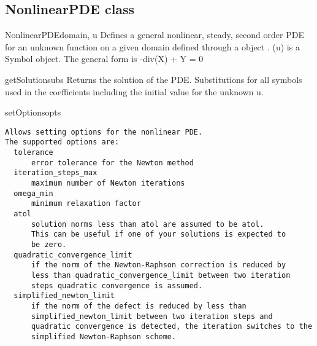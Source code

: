 \subsection{NonlinearPDE class}
\begin{classdesc}{NonlinearPDE}{domain, u}
Defines a general nonlinear, steady, second order PDE for an unknown function  on a given domain defined through a \Domain object . \var(u) is a Symbol object.
The general form is -div(X) + Y = 0 
\end{classdesc}
\iffalse
\begin{methoddesc}[NonlinearPDE]{concatenateRow}{}
test
\end{methoddesc}
\begin{methoddesc}[NonlinearPDE]{createCoefficient}{}
test
\end{methoddesc}
\begin{methoddesc}[NonlinearPDE]{getUnknownSymbol}{}
test
\end{methoddesc}
\begin{methoddesc}[NonlinearPDE]{getLinearSolverOptions}{}
test
\end{methoddesc}
\begin{methoddesc}[NonlinearPDE]{getLinearPDE}{}
test
\end{methoddesc}
\begin{methoddesc}[NonlinearPDE]{getNumSolutions}{}
test
\end{methoddesc}
\begin{methoddesc}[NonlinearPDE]{getShapeOfCoefficient}{}
test
\end{methoddesc}
\begin{methoddesc}[NonlinearPDE]{getCoefficient}{}
test
\end{methoddesc}
\begin{methoddesc}[NonlinearPDE]{getSensitivity}{}
test
\end{methoddesc}
\fi
\begin{methoddesc}[NonlinearPDE]{getSolution}{subs}
Returns the solution of the PDE. Substitutions for all symbols used in the coefficients including the initial value for the unknown u.
\end{methoddesc}
\pagebreak
\begin{methoddesc}[NonlinearPDE]{setOptions}{opts}
\begin{verbatim}
Allows setting options for the nonlinear PDE.
The supported options are:
  tolerance
      error tolerance for the Newton method
  iteration_steps_max
      maximum number of Newton iterations
  omega_min
      minimum relaxation factor
  atol
      solution norms less than atol are assumed to be atol.
      This can be useful if one of your solutions is expected to
      be zero.
  quadratic_convergence_limit
      if the norm of the Newton-Raphson correction is reduced by
      less than quadratic_convergence_limit between two iteration
      steps quadratic convergence is assumed.
  simplified_newton_limit
      if the norm of the defect is reduced by less than
      simplified_newton_limit between two iteration steps and
      quadratic convergence is detected, the iteration switches to the
      simplified Newton-Raphson scheme.
\end{verbatim}

\end{methoddesc}
